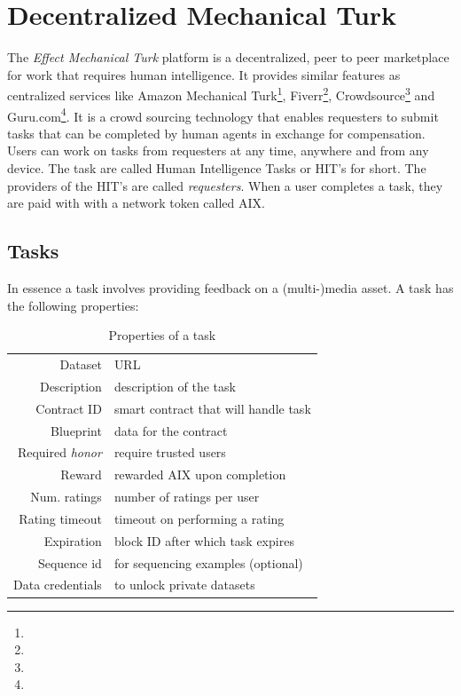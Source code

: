 \documentclass{article}
\begin{document}
\section{Decentralized Mechanical Turk}
\label{sec:phase1}
The \emph{Effect Mechanical Turk} platform is a decentralized, peer to
peer marketplace for work that requires human intelligence.  It
provides similar features as centralized services like Amazon
Mechanical Turk\footnote{}, Fiverr\footnote{}, Crowdsource\footnote{}
and Guru.com\footnote{}. It is a crowd sourcing technology that
enables requesters to submit tasks that can be completed by human
agents in exchange for compensation. Users can work on tasks from
requesters at any time, anywhere and from any device. The task are
called Human Intelligence Tasks or HIT’s for short. The providers of
the HIT’s are called \emph{requesters}. When a user completes a task,
they are paid with with a network token called AIX.

\subsection{Tasks}
In essence a task involves providing feedback on a (multi-)media
asset. A task has the following properties:

\begin{table}[h]
  \centering
  \begin{tabular}[h]{r|l}
    Dataset & URL \\
    Description & description of the task \\ 
    Contract ID & smart contract that will handle task \\
    Blueprint & data for the contract \\ 
    Required \emph{honor} & require trusted users \\
    Reward & rewarded AIX upon completion \\
    Num. ratings & number of ratings per user \\
    Rating timeout & timeout on performing a rating \\ 
    Expiration  & block ID after which task expires \\
    Sequence id & for sequencing examples (optional)\\
    Data credentials & to unlock private datasets \\
  \end{tabular}
  \caption{Properties of a task}
  \label{tab:task}
\end{table}
\end{document}

